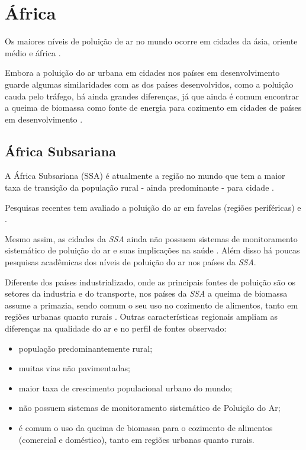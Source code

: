 \section{África}

Os maiores níveis de poluição de ar no mundo ocorre
em cidades da ásia, oriente médio e áfrica \cite{brauer2012}.   

Embora a poluição do ar urbana em cidades nos países em 
desenvolvimento guarde algumas similaridades com as dos 
países desenvolvidos, como a poluição cauda pelo tráfego, 
há ainda grandes diferenças, já que ainda é comum encontrar
a queima de biomassa como fonte de energia para cozimento em
cidades de países em desenvolvimento \cite{brauer2012}.  



\subsection{África Subsariana}
A África Subsariana (SSA) é atualmente a região no mundo que tem a maior taxa de transição 
da população rural - ainda predominante - para cidade \citep{MONTGOMERY2008}.

Pesquisas recentes tem avaliado a poluição do ar em favelas 
(regiões periféricas) \citep{SCLAR2005} e \citep{RILEY2007}. 

Mesmo assim, as cidades da \textit{SSA} ainda não possuem sistemas de 
monitoramento sistemático de poluição do ar e suas implicações na saúde 
\citep{EZZATI2004}. 
Além disso há poucas pesquisas acadêmicas dos níveis de poluição do ar nos 
países da \textit{SSA}.

Diferente dos países industrializado, onde as principais fontes de poluição 
são os setores da industria e do transporte, nos países da \textit{SSA} a 
queima de biomassa assume a primazia, sendo comum o seu uso no cozimento 
de alimentos, tanto em regiões urbanas quanto rurais \citep{SMITH2004}. 
Outras características regionais ampliam as diferenças na qualidade do ar 
e no perfil de fontes observado:

\begin{itemize}
  \item população predominantemente rural;
  \item muitas vias não pavimentadas;
  \item maior taxa de crescimento populacional urbano do mundo;
  \item não possuem sistemas de monitoramento sistemático de Poluição do Ar;
  \item é comum o uso da queima de biomassa para o cozimento de alimentos  
        (comercial e doméstico), tanto em regiões urbanas quanto rurais.
\end{itemize}



